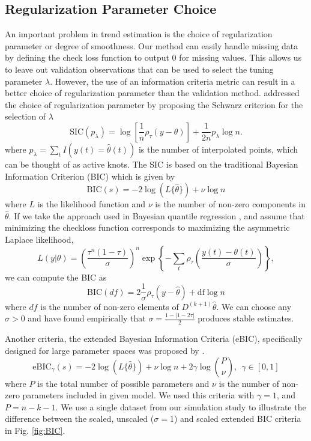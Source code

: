 \documentclass[12pt]{article}
\begin{document}
	\subsection{Regularization Parameter Choice}
	\label{sec:lambda_choice}
	An important problem in trend estimation is the choice of regularization parameter or degree of smoothness. Our method can easily handle missing data by defining the check loss function to output 0 for missing values. This allows us to leave out validation observations that can be used to select the tuning parameter $\lambda$. However, the use of an information criteria metric can result in a better choice of regularization parameter than the validation method.  \cite{KoenkerNgPortnoy1994} addressed the choice of regularization parameter by proposing the Schwarz criterion for the selection of $\lambda$
	\begin{equation}
	\label{eq:SIC}
	\mbox{SIC}(p_{\lambda}) = \log\left[\frac{1}{n}\rho_{\tau}(y - \theta)\right] + \frac{1}{2n}p_{\lambda}\log n.
	\end{equation}
	where $p_{\lambda} = \sum_t I(y(t) = \widehat{\theta}(t))$ is the number of interpolated points, which can be thought of as active knots. The SIC is based on the traditional Bayesian Information Criterion (BIC) which is given by 
	\begin{equation}
	\mbox{BIC}(s) = -2\log(L\{\hat{\theta}\}) + \nu\log n 
	\end{equation}	
	where $L$ is the likelihood function and $\nu$ is the number of non-zero components in $\hat{\theta}$. If we take the approach used in Bayesian quantile regression \citep{yu2001bayesian}, and assume that minimizing the checkloss function corresponds to maximizing the asymmetric Laplace likelihood, \begin{equation}
	L(y|\theta) = \left(\frac{\tau^n(1-\tau)}{\sigma}\right)^n\exp\left\{-\sum_t\rho_\tau\left(\frac{y(t) - \theta(t)}{\sigma}\right)\right\},
	\end{equation} 
	we can compute the BIC as 
	\begin{equation}
	\mbox{BIC}(df) = 2\frac{1}{\sigma}\rho_{\tau}(y-\hat{\theta}) + \mbox{df}\log n
	\end{equation} 
	where $df$ is the number of non-zero elements of $D^{(k+1)}\hat{\theta}$. We can choose any $\sigma>0$ and have found empirically that $\sigma =  \frac{1-|1-2\tau|}{2}$ produces stable estimates. 
	
	Another criteria, the extended Bayesian Information Criteria (eBIC), specifically designed for large parameter spaces was proposed by \cite{chen2008}. 
	\begin{equation}
	\label{eq:eBIC}
	\mbox{eBIC}_{\gamma}(s) = -2\log(L\{\hat{\theta}\}) + \nu\log n  + 2\gamma\log{P \choose \nu},~~\gamma \in [0,1]
	\end{equation}
	where $P$ is the total number of possible parameters and $\nu$ is the number of non-zero parameters included in given model. We used this criteria with $\gamma = 1$, and $P=n-k-1$. We use a single dataset from our simulation study to illustrate the difference between the scaled, unscaled ($\sigma = 1$) and scaled extended BIC criteria in Fig. \ref{fig:BIC}. 
	
\end{document}
